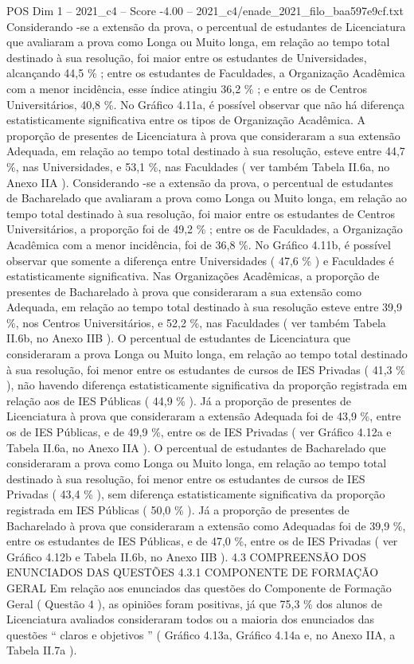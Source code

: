 \begin{textsample}{POS Dim 1 – 2021\_c4 – Score -4.00 – 2021\_c4/enade\_2021\_filo\_baa597e9cf.txt}
Considerando -se a extensão da prova, o percentual de estudantes de Licenciatura que avaliaram a prova como Longa ou Muito longa, em relação ao tempo total destinado à sua resolução, foi maior entre os estudantes de Universidades, alcançando 44,5 \% ; entre os estudantes de Faculdades, a Organização Acadêmica com a menor incidência, esse índice atingiu 36,2 \% ; e entre os de Centros Universitários, 40,8 \%.
No Gráfico 4.11a, é possível observar que não há diferença estatisticamente significativa entre os tipos de Organização Acadêmica.
A proporção de presentes de Licenciatura à prova que consideraram a sua extensão Adequada, em relação ao tempo total destinado à sua resolução, esteve entre 44,7 \%, nas Universidades, e 53,1 \%, nas Faculdades ( ver também Tabela II.6a, no Anexo IIA ).
Considerando -se a extensão da prova, o percentual de estudantes de Bacharelado que avaliaram a prova como Longa ou Muito longa, em relação ao tempo total destinado à sua resolução, foi maior entre os estudantes de Centros Universitários, a proporção foi de 49,2 \% ; entre os de Faculdades, a Organização Acadêmica com a menor incidência, foi de 36,8 \%.
No Gráfico 4.11b, é possível observar que somente a diferença entre Universidades ( 47,6 \% ) e Faculdades é estatisticamente significativa.
Nas Organizações Acadêmicas, a proporção de presentes de Bacharelado à prova que consideraram a sua extensão como Adequada, em relação ao tempo total destinado à sua resolução esteve entre 39,9 \%, nos Centros Universitários, e 52,2 \%, nas Faculdades ( ver também Tabela II.6b, no Anexo IIB ).
O percentual de estudantes de Licenciatura que consideraram a prova Longa ou Muito longa, em relação ao tempo total destinado à sua resolução, foi menor entre os estudantes de cursos de IES Privadas ( 41,3 \% ), não havendo diferença estatisticamente significativa da proporção registrada em relação aos de IES Públicas ( 44,9 \% ).
Já a proporção de presentes de Licenciatura à prova que consideraram a extensão Adequada foi de 43,9 \%, entre os de IES Públicas, e de 49,9 \%, entre os de IES Privadas ( ver Gráfico 4.12a e Tabela II.6a, no Anexo IIA ).
O percentual de estudantes de Bacharelado que consideraram a prova como Longa ou Muito longa, em relação ao tempo total destinado à sua resolução, foi menor entre os estudantes de cursos de IES Privadas ( 43,4 \% ), sem diferença estatisticamente significativa da proporção registrada em IES Públicas ( 50,0 \% ).
Já a proporção de presentes de Bacharelado à prova que consideraram a extensão como Adequadas foi de 39,9 \%, entre os estudantes de IES Públicas, e de 47,0 \%, entre os de IES Privadas ( ver Gráfico 4.12b e Tabela II.6b, no Anexo IIB ). 4.3 COMPREENSÃO DOS ENUNCIADOS DAS QUESTÕES 4.3.1 COMPONENTE DE FORMAÇÃO GERAL Em relação aos enunciados das questões do Componente de Formação Geral ( Questão 4 ), as opiniões foram positivas, já que 75,3 \% dos alunos de Licenciatura avaliados consideraram todos ou a maioria dos enunciados das questões “ claros e objetivos ” ( Gráfico 4.13a, Gráfico 4.14a e, no Anexo IIA, a Tabela II.7a ).

\end{textsample}
